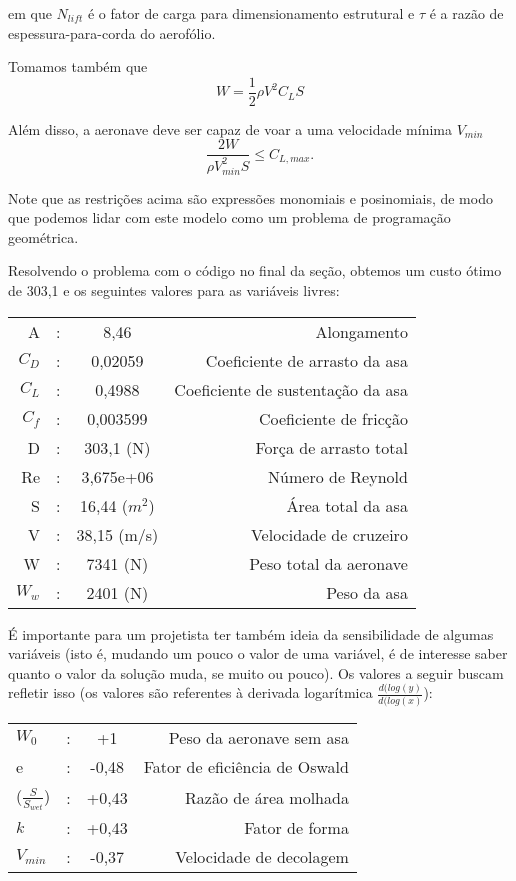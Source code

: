 \noindent em que $N_{lift}$ é o fator de carga para dimensionamento estrutural e
$\tau$ é a razão de espessura-para-corda do aerofólio.

Tomamos também que
\[
W = \frac{1}{2} \rho V^2 C_L S
\]

Além disso, a aeronave deve ser capaz de voar a uma velocidade mínima
$V_{min}$
\[
  \frac{2W}{\rho V_{min}^2 S} \leq C_{L,max}.
\]


Note que as restrições acima são expressões monomiais e posinomiais,
de modo que podemos lidar com este modelo como um problema de programação
geométrica.

Resolvendo o problema com o código no final da seção, obtemos um custo ótimo de 303,1 e os seguintes
valores para as variáveis livres:

\begin{tabular}{r c c r}
  A & : & 8,46 & Alongamento \\ $C_D$ & : & 0,02059 & Coeficiente de
  arrasto da asa \\ $C_L$ & : & 0,4988 & Coeficiente de sustentação da
  asa \\ $C_f$ & : & 0,003599 & Coeficiente de fricção \\ D & : &
  303,1 (N) & Força de arrasto total \\ Re & : & 3,675e+06 & Número de
  Reynold \\ S & : & 16,44 ($m^2$) & Área total da asa \\ V & : &
  38,15 (m/s) & Velocidade de cruzeiro \\ W & : & 7341 (N) & Peso
  total da aeronave \\ $W_w$ & : & 2401 (N) & Peso da asa \\
\end{tabular}

É importante para um projetista ter também ideia da sensibilidade de
algumas variáveis (isto é, mudando um pouco o valor de uma variável, é
de interesse saber quanto o valor da solução muda, se muito ou
pouco). Os valores a seguir buscam refletir isso (os valores são
referentes à derivada logarítmica $\frac{d(log(y)}{d(log(x)}$):

\begin{tabular}{l c  c  r}
  $W_0$ & : & +1 & Peso da aeronave sem asa \\ e & : & -0,48 & Fator
  de eficiência de Oswald \\ ($\frac{S}{S_{wet}}$) & : & +0,43 & Razão
  de área molhada \\ $k$ & : & +0,43 & Fator de forma \\ $V_{min}$ & : &
  -0,37 & Velocidade de decolagem \\
\end{tabular}


